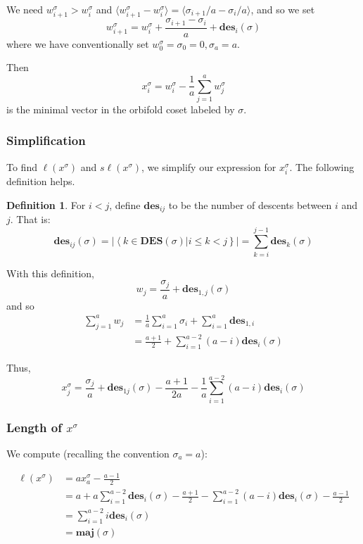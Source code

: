 \documentclass{amsart}[12pt]
\theoremstyle{definition}
\newtheorem{definition}[dummy]{Definition}
\newcommand{\sk}{s\ell}
\newcommand{\DES}{\mathbf{DES}}
\newcommand{\des}{\mathbf{des}}
\newcommand{\maj}{\mathbf{maj}}
\begin{document}
We need $w^\sigma_{i+1}>w^\sigma_i$ and $\langle w^\sigma_{i+1}-w^\sigma_i\rangle=\langle\sigma_{i+1}/a-\sigma_i/a\rangle$, and so we set
$$w^\sigma_{i+1}=w^\sigma_i+\frac{\sigma_{i+1}-\sigma_i}{a}+\des_i(\sigma)$$
where we have conventionally set $w^\sigma_0=\sigma_0=0, \sigma_a=a$.

Then
$$x_i^\sigma=w_i^\sigma-\frac{1}{a}\sum_{j=1}^a w^\sigma_j$$
is the minimal vector in the orbifold coset labeled by $\sigma$.
\subsubsection{Simplification}
 To find $\ell(x^\sigma)$ and $\sk(x^\sigma)$, we simplify our expression for $x_i^\sigma$.  The following definition helps.
\begin{definition}
For $i<j$, define $\des_{ij}$ to be the number of descents between $i$ and $j$.  That is:
$$\des_{ij}(\sigma)=\left|\left\langle k\in\DES(\sigma)\big| i\leq k < j\right\}\right|=\sum_{k=i}^{j-1}\des_k(\sigma)$$
\end{definition}

With this definition,
$$w_j=\frac{\sigma_j}{a}+\des_{1,j}(\sigma)$$
and so
\begin{align*}
\sum_{j=1}^a w_j &=\frac{1}{a}\sum_{i=1}^a \sigma_i +\sum_{i=1}^a \des_{1,i} \\
 &=\frac{a+1}{2}+\sum_{i=1}^{a-2} (a-i)\des_i(\sigma)
\end{align*}

Thus,
$$x^\sigma_j=\frac{\sigma_j}{a}+\des_{1j}(\sigma)-\frac{a+1}{2a}-\frac{1}{a}\sum_{i=1}^{a-2} (a-i)\des_i(\sigma)$$

\subsubsection{Length of $x^\sigma$}
We compute (recalling the convention $\sigma_a=a$):

\begin{align*}
\ell(x^\sigma) &= a x^\sigma_a-\frac{a-1}{2} \\
&=a+a\sum_{i=1}^{a-2} \des_i(\sigma)-\frac{a+1}{2}-\sum_{i=1}^{a-2} (a-i)\des_i(\sigma)-\frac{a-1}{2} \\
&=\sum_{i=1}^{a-2} i\des_i(\sigma) \\
&=\maj(\sigma)
\end{align*}
\end{document}

